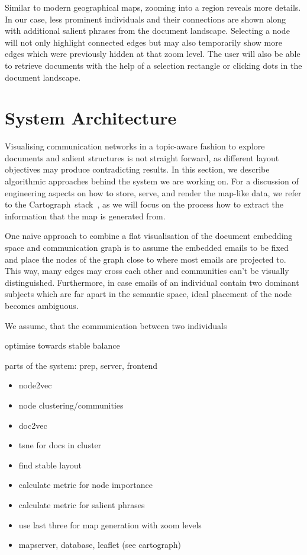 Similar to modern geographical maps, zooming into a region reveals more details.
In our case, less prominent individuals and their connections are shown along with additional salient phrases from the document landscape.
Selecting a node will not only highlight connected edges but may also temporarily show more edges which were previously hidden at that zoom level.
The user will also be able to retrieve documents with the help of a selection rectangle or clicking dots in the document landscape.



\section{System Architecture}
Visualising communication networks in a topic-aware fashion to explore documents and salient structures is not straight forward, as different layout objectives may produce contradicting results.
In this section, we describe algorithmic approaches behind the system we are working on.
For a discussion of engineering aspects on how to store, serve, and render the map-like data, we refer to the Cartograph~stack~\cite{sen2017cartograph}, as we will focus on the process how to extract the information that the map is generated from.


One na\"ive approach to combine a flat visualisation of the document embedding space and communication graph is to assume the embedded emails to be fixed and place the nodes of the graph close to where most emails are projected to.
This way, many edges may cross each other and communities can't be visually distinguished.
Furthermore, in case emails of an individual contain two dominant subjects which are far apart in the semantic space, ideal placement of the node becomes ambiguous.

We assume, that the communication between two individuals 

optimise towards
stable balance



parts of the system: prep, server, frontend
\begin{itemize}
\item node2vec
\item node clustering/communities
\item doc2vec
\item tsne for docs in cluster
\item find stable layout
\item calculate metric for node importance
\item calculate metric for salient phrases
\item use last three for map generation with zoom levels
\item mapserver, database, leaflet (see cartograph)
\end{itemize}

